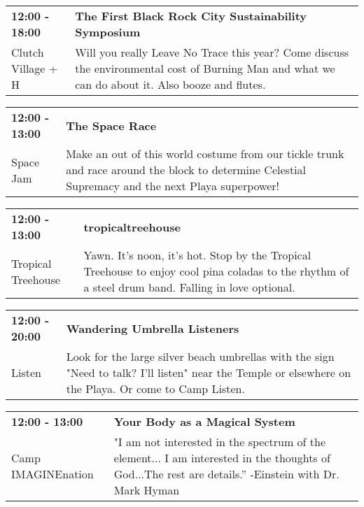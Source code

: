 \begin{tabular}{ p{1in} p{2.2in} }
    \textbf{12:00 - 18:00} & \textbf{The First Black Rock City Sustainability Symposium} \\
    Clutch Village \newline 545 + H & Will you really Leave No Trace this year? Come discuss the environmental cost of Burning Man and what we can do about it. Also booze and flutes. \\
    \hline 
\end{tabular}
    
\begin{tabular}{ p{1in} p{2.2in} }
    \textbf{12:00 - 13:00} & \textbf{The Space Race} \\
    Space Jam \newline  & Make an out of this world costume from our tickle trunk and race around the block to determine Celestial Supremacy and the next Playa superpower! \\
    \hline 
\end{tabular}
    
\begin{tabular}{ p{1in} p{2.2in} }
    \textbf{12:00 - 13:00} & \textbf{tropicaltreehouse} \\
    Tropical Treehouse \newline  & Yawn. It's noon, it's hot.  Stop by the Tropical Treehouse to enjoy cool pina coladas to the rhythm of a steel drum band. Falling in love optional. \\
    \hline 
\end{tabular}
    
\begin{tabular}{ p{1in} p{2.2in} }
    \textbf{12:00 - 20:00} & \textbf{Wandering Umbrella Listeners} \\
    Listen \newline  & Look for the large silver beach umbrellas with the sign "Need to talk? I'll listen" near the Temple or elsewhere on the Playa. Or come to Camp Listen. \\
    \hline 
\end{tabular}
    
\begin{tabular}{ p{1in} p{2.2in} }
    \textbf{12:00 - 13:00} & \textbf{Your Body as a Magical System} \\
    Camp IMAGINEnation \newline  & "I am not interested in the spectrum of the element... I am interested in the thoughts of God...The rest are details.'' -Einstein  with Dr. Mark Hyman \\
    \hline 
\end{tabular}
    
